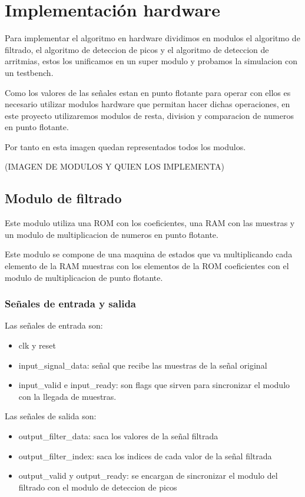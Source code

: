 \chapter{Implementación hardware}

Para implementar el algoritmo en hardware dividimos en modulos el algoritmo de filtrado, el algoritmo
de deteccion de picos y el algoritmo de deteccion de arritmias, estos los unificamos en un super modulo 
y probamos la simulacion con un testbench.

Como los valores de las señales estan en punto flotante para operar con ellos es necesario utilizar modulos
hardware que permitan hacer dichas operaciones, en este proyecto utilizaremos modulos de resta, division y 
comparacion de numeros en punto flotante.

Por tanto en esta imagen quedan representados todos los modulos.

(IMAGEN DE MODULOS Y QUIEN LOS IMPLEMENTA)

\section{Modulo de filtrado}

Este modulo utiliza una ROM con los coeficientes, una RAM con las muestras y un modulo de multiplicacion
de numeros en punto flotante.

Este modulo se compone de una maquina de estados que va multiplicando cada elemento de la RAM muestras 
con los elementos de la ROM coeficientes con el modulo de multiplicacion de punto flotante.

\subsection{Señales de entrada y salida}

Las señales de entrada son:

\begin{itemize}
\item clk y reset
\item input\_signal\_data: señal que recibe las muestras de la señal original 
\item input\_valid e input\_ready: son flags que sirven para sincronizar el modulo con la llegada de muestras. 
\end{itemize}

Las señales de salida son:

\begin{itemize}
    \item output\_filter\_data: saca los valores de la señal filtrada
    \item output\_filter\_index: saca los indices de cada valor de la señal filtrada
    \item output\_valid y output\_ready: se encargan de sincronizar el modulo del filtrado 
    con el modulo de deteccion de picos
\end{itemize}

